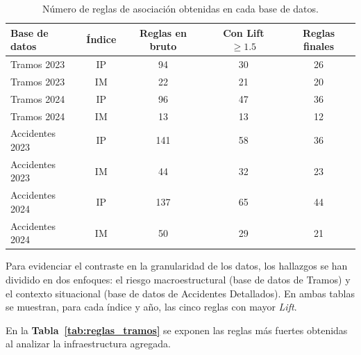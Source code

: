 \documentclass[twoside,a4paper,12pt,onecolumn,openany]{book}
\begin{document}
\begin{table}[H]
    \centering
    \caption{Número de reglas de asociación obtenidas en cada base de datos.}
    \vspace{0.3cm}
    \label{tab:resumen_reglas}
    \renewcommand{\arraystretch}{1.3}
    \begin{tabular}{lcccc}
        \toprule
        \textbf{Base de datos} & \textbf{Índice} & \textbf{Reglas en bruto} & \textbf{Con Lift $\geq 1.5$} & \textbf{Reglas finales} \\
        \midrule
        Tramos 2023     & IP & 94  & 30 & 26 \\
        Tramos 2023     & IM & 22  & 21 & 20 \\
        Tramos 2024     & IP & 96  & 47 & 36 \\
        Tramos 2024     & IM & 13  & 13 & 12 \\
        \midrule
        Accidentes 2023 & IP & 141 & 58 & 36 \\
        Accidentes 2023 & IM & 44  & 32 & 23 \\
        Accidentes 2024 & IP & 137 & 65 & 44 \\
        Accidentes 2024 & IM & 50  & 29 & 21 \\
        \bottomrule
    \end{tabular}
\end{table}

\vspace{0.5cm}

Para evidenciar el contraste en la granularidad de los datos, los hallazgos se han dividido en dos enfoques: el riesgo macroestructural (base de datos de Tramos) y el contexto situacional (base de datos de Accidentes Detallados). En ambas tablas se muestran, para cada índice y año, las cinco reglas con mayor \textit{Lift}.

\vspace{0.5cm}

En la \textbf{Tabla~\ref{tab:reglas_tramos}} se exponen las reglas más fuertes obtenidas al analizar la infraestructura agregada.
\end{document}

